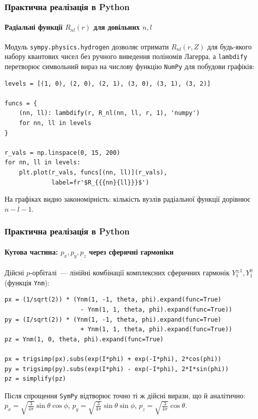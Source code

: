 \documentclass[]{beamer}
\begin{document}
\begin{frame}[fragile]
	\frametitle{Практична реалізація в Python}
	\framesubtitle{Радіальні функції $R_{nl}(r)$ для довільних $n,l$}

	Модуль \texttt{sympy.physics.hydrogen} дозволяє отримати $R_{nl}(r,Z)$ для будь-якого набору квантових чисел без ручного виведення поліномів Лагерра, а \texttt{lambdify} перетворює символьний вираз на числову функцію \texttt{NumPy} для побудови графіків:
	\begin{verbatim}
levels = [(1, 0), (2, 0), (2, 1), (3, 0), (3, 1), (3, 2)]

funcs = {
    (nn, ll): lambdify(r, R_nl(nn, ll, r, 1), 'numpy')
    for nn, ll in levels
}

r_vals = np.linspace(0, 15, 200)
for nn, ll in levels:
    plt.plot(r_vals, funcs[(nn, ll)](r_vals),
             label=fr'$R_{{{nn}{ll}}}$')
	\end{verbatim}

	На графіках видно закономірність: кількість вузлів радіальної функції дорівнює $n-l-1$.
\end{frame}
\begin{frame}[fragile]
	\frametitle{Практична реалізація в Python}
	\framesubtitle{Кутова частина: $p_x, p_y, p_z$ через сферичні гармоніки}

	Дійсні $p$-орбіталі~--- лінійні комбінації комплексних сферичних гармонік $Y_1^{\pm1}, Y_1^0$ (функція \texttt{Ynm}):
	\begin{verbatim}
px = (1/sqrt(2)) * (Ynm(1, -1, theta, phi).expand(func=True)
                     - Ynm(1, 1, theta, phi).expand(func=True))
py = (I/sqrt(2)) * (Ynm(1, -1, theta, phi).expand(func=True)
                     + Ynm(1, 1, theta, phi).expand(func=True))
pz = Ynm(1, 0, theta, phi).expand(func=True)

px = trigsimp(px).subs(exp(I*phi) + exp(-I*phi), 2*cos(phi))
py = trigsimp(py).subs(exp(I*phi) - exp(-I*phi), 2*I*sin(phi))
pz = simplify(pz)
	\end{verbatim}

	Після спрощення \texttt{SymPy} відтворює точно ті ж дійсні вирази, що й аналітично: $p_x=\sqrt{\tfrac{3}{4\pi}}\sin\theta\cos\phi$, $p_y=\sqrt{\tfrac{3}{4\pi}}\sin\theta\sin\phi$, $p_z=\sqrt{\tfrac{3}{4\pi}}\cos\theta$.
\end{frame}
\end{document}
